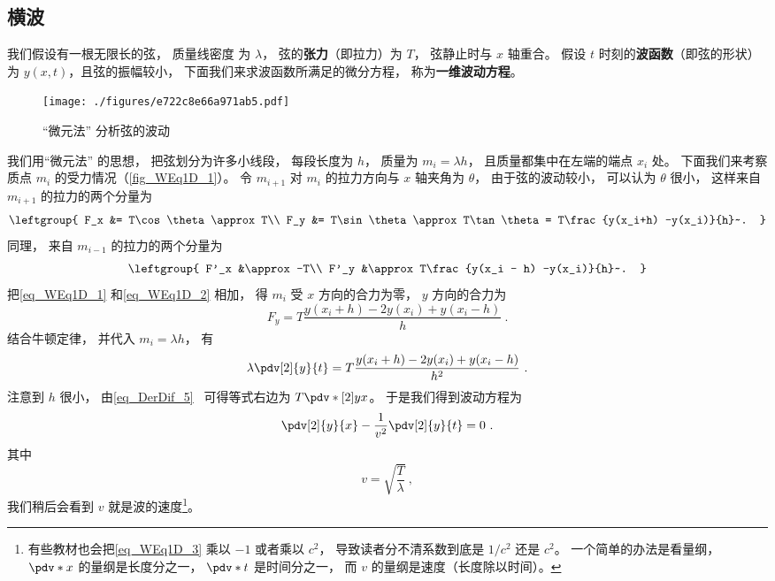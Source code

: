 

\subsection{横波}
我们假设有一根无限长的弦， 质量线密度%
为 $\lambda$， 弦的\textbf{张力}（即拉力）为 $T$， 弦静止时与 $x$ 轴重合。 假设 $t$ 时刻的\textbf{波函数}（即弦的形状）为 $y(x, t)$，且弦的振幅较小， 下面我们来求波函数所满足的微分方程， 称为\textbf{一维波动方程}。

\begin{figure}[ht]
\centering
\texttt{[image: ./figures/e722c8e66a971ab5.pdf]}
\caption{“微元法” 分析弦的波动} \label{fig_WEq1D_1}
\end{figure}

我们用“微元法” 的思想， 把弦划分为许多小线段， 每段长度为 $h$， 质量为 $m_i = \lambda h$， 且质量都集中在左端的端点 $x_i$ 处。 下面我们来考察质点 $m_i$ 的受力情况（\autoref{fig_WEq1D_1}）。 令 $m_{i+1}$ 对 $m_i$ 的拉力方向与 $x$ 轴夹角为 $\theta$， 由于弦的波动较小， 可以认为 $\theta$ 很小， 这样来自 $m_{i+1}$ 的拉力的两个分量为
\begin{equation}\label{eq_WEq1D_1}
\leftgroup{
F_x &= T\cos\theta \approx T\\
F_y &= T\sin\theta \approx T\tan\theta = T\frac{y(x_i+h) -y(x_i)}{h}~.
}\end{equation}
同理， 来自 $m_{i-1}$ 的拉力的两个分量为
\begin{equation}\label{eq_WEq1D_2}
\leftgroup{
F'_x &\approx -T\\
F'_y &\approx T\frac{y(x_i - h) -y(x_i)}{h}~.
}\end{equation}
把\autoref{eq_WEq1D_1} 和\autoref{eq_WEq1D_2} 相加， 得 $m_i$ 受 $x$ 方向的合力为零， $y$ 方向的合力为
\begin{equation}
F_y = T\frac{y(x_i+h) - 2y(x_i) + y(x_i-h)}{h}~.
\end{equation}
结合牛顿定律， 并代入 $m_i = \lambda h$， 有
\begin{equation}
\lambda \pdv[2]{y}{t} = T\frac{y(x_i+h) - 2y(x_i) + y(x_i-h)}{h^2}~.
\end{equation}
注意到 $h$ 很小， 由\autoref{eq_DerDif_5}~ 可得等式右边为 $T\pdv*[2]{y}{x}$。 于是我们得到波动方程为
\begin{equation}\label{eq_WEq1D_3}
\pdv[2]{y}{x} - \frac{1}{v^2}\pdv[2]{y}{t} = 0~.
\end{equation}
其中
\begin{equation}
v = \sqrt{\frac{T}{\lambda}}~,
\end{equation}
我们稍后会看到 $v$ 就是波的速度\footnote{有些教材也会把\autoref{eq_WEq1D_3} 乘以 $-1$ 或者乘以 $c^2$， 导致读者分不清系数到底是 $1/c^2$ 还是 $c^2$。 一个简单的办法是看量纲， $\pdv*{x}$ 的量纲是长度分之一， $\pdv*{t}$ 是时间分之一， 而 $v$ 的量纲是速度（长度除以时间）。}。

